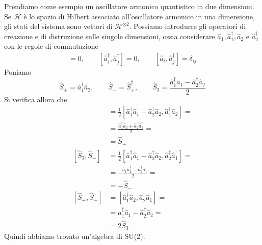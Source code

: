 \documentclass[a4paper, 11pt]{article}
\newcommand{\op}[1]{\hat{#1}}
\renewcommand{\H}{\mathcal{H}}
\renewcommand{\op}[1]{\hat{#1}}
\begin{document}
Prendiamo come esempio un oscillatore armonico quantistico in due dimensioni. Se $\H$ è lo spazio di Hilbert associato all'oscillatore armonico in una dimensione, gli stati del sistema sono vettori di $\H^{\otimes2}$. Possiamo introdurre gli operatori di creazione e di distruzione sulle singole dimensioni, ossia considerare $\op a_1,\op a^\dagger_1,\op a_2$ e $\op a^\dagger_2$ con le regole di commutazione
\begin{align*}
	[\op a_i,\op a_j]=0,\qquad[\op a^\dagger_i,\op a^\dagger_j]=0,\qquad[\op a_i,\op a^\dagger_j]=\delta_{ij}
\end{align*}
Poniamo 
\[\op S_+=\op a_1^\dagger\op a_2,\qquad\op S_-=\op S_+^\dagger,\qquad\op S_3=\frac{\op a^\dagger_1\op a_1-\op a^\dagger_2\op a_2}{2}\]
Si verifica allora che
\begin{align*}
	[\op S_3,\op S_+]&=\frac{1}{2}[\op a_1^\dagger\op a_1-\op a_2^\dagger\op a_2,\op a_1^\dagger\op a_2]=\\&=\frac{\op a_1^\dagger\op a_2+\op a_2\op a_1^\dagger}{2}=\\&=\op S_+\\{[\op S_3,\op S_-]}&=\frac{1}{2}[\op a_1^\dagger\op a_1-\op a_2^\dagger\op a_2,\op a_2^\dagger\op a_1]=\\&=\frac{-\op a_1\op a_2^\dagger-\op a_2^\dagger\op a_1}{2}=\\&=-\op S_-\\{[\op S_+,\op S_-]}&=[\op a_1^\dagger\op a_2,\op a_2^\dagger\op a_1]=\\&=\op a_1^\dagger\op a_1-\op a_2^\dagger\op a_2=\\&=2\op S_3
\end{align*}
Quindi abbiamo trovato un'algebra di SU(2).
\end{document}
